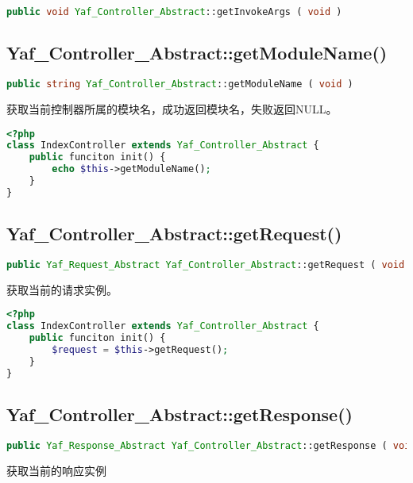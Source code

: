 \begin{lstlisting}[language=PHP]
public void Yaf_Controller_Abstract::getInvokeArgs ( void )
\end{lstlisting}

\subsection{Yaf\_Controller\_Abstract::getModuleName()}

\begin{lstlisting}[language=PHP]
public string Yaf_Controller_Abstract::getModuleName ( void )
\end{lstlisting}


获取当前控制器所属的模块名，成功返回模块名，失败返回NULL。

\begin{lstlisting}[language=PHP]
<?php
class IndexController extends Yaf_Controller_Abstract {
    public funciton init() {
        echo $this->getModuleName();
    }
}
\end{lstlisting}




\subsection{Yaf\_Controller\_Abstract::getRequest()}


\begin{lstlisting}[language=PHP]
public Yaf_Request_Abstract Yaf_Controller_Abstract::getRequest ( void )
\end{lstlisting}

获取当前的请求实例。


\begin{lstlisting}[language=PHP]
<?php
class IndexController extends Yaf_Controller_Abstract {
    public funciton init() {
        $request = $this->getRequest();
    }
}
\end{lstlisting}



\subsection{Yaf\_Controller\_Abstract::getResponse()}


\begin{lstlisting}[language=PHP]
public Yaf_Response_Abstract Yaf_Controller_Abstract::getResponse ( void )
\end{lstlisting}

获取当前的响应实例

